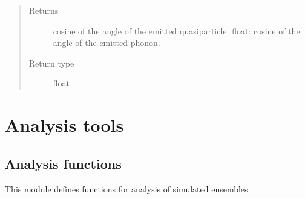 \documentclass[letterpaper,10pt,english]{sphinxmanual}
\begin{document}
\begin{fulllineitems}
\begin{fulllineitems}
\begin{quote}
\begin{description}
\item[{Returns}] \leavevmode
cosine of the angle of the emitted quasiparticle.
float: cosine of the angle of the emitted phonon.

\item[{Return type}] \leavevmode
float

\end{description}\end{quote}

\end{fulllineitems}


\end{fulllineitems}



\section{Analysis tools}
\label{\detokenize{analysis:analysis-tools}}\label{\detokenize{analysis::doc}}

\subsection{Analysis functions}
\label{\detokenize{analysis:module-scdc.analyze}}\label{\detokenize{analysis:analysis-functions}}
This module defines functions for analysis of simulated ensembles.
\end{document}
